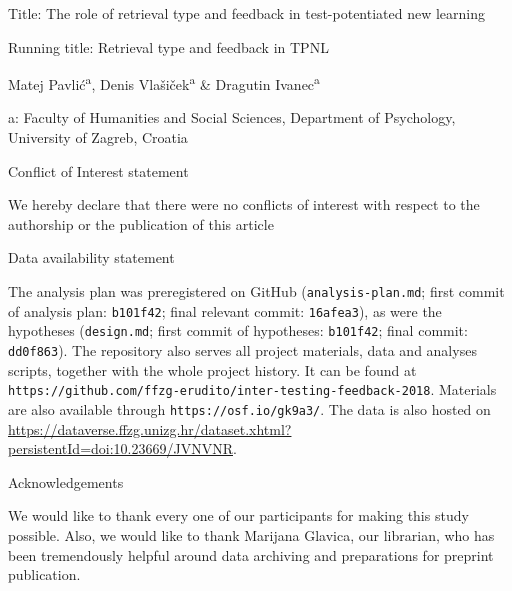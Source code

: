 \documentclass[12pt]{article}
\begin{document}
\begin{titlepage}
    \begin{center}

        \vspace*{\fill}

        Title: The role of retrieval type and feedback in 
        test-potentiated new learning
        
        Running title: Retrieval type and feedback in TPNL

        \bigskip
        Matej Pavlić\textsuperscript{a}, Denis Vlašiček\textsuperscript{a} 
        \& Dragutin Ivanec\textsuperscript{a}

        a: Faculty of Humanities and Social Sciences, Department of 
        Psychology, University of Zagreb, Croatia

        \bigskip
		\bigskip
		\bigskip

	    \end{center}
		
		{\centering
			Conflict of Interest statement\par}
		We hereby declare that there were no conflicts of 
		interest with respect to the authorship or the 
		publication of this article
		
		\bigskip
		
		{\centering
		Data availability statement\par}

		The analysis plan was preregistered on GitHub 
		(\texttt{analysis-plan.md};
		first commit of analysis plan: \texttt{b101f42}; 
		final relevant commit:
		\texttt{16afea3}), as were the hypotheses 
		(\texttt{design.md}; first commit of hypotheses:
		\texttt{b101f42}; final commit: \texttt{dd0f863}).  
		The repository also serves all
		project materials, data and analyses scripts, 
		together with the whole project
		history. It can be found at
		\texttt{https://github.com/ffzg-erudito/inter-testing-feedback-2018}.
		Materials are also available through 
		\texttt{https://osf.io/gk9a3/}. The data
		is also hosted on
		\url{https://dataverse.ffzg.unizg.hr/dataset.xhtml?persistentId=doi:10.23669/JVNVNR}.

		\bigskip
		
		{\centering
			Acknowledgements\par}
		
		We would like to thank every one of our 
		participants for making this study
		possible. Also, we would like to thank Marijana 
		Glavica, our librarian,
		who has been tremendously helpful around data 
		archiving and preparations
		for preprint publication.	
		

		
		
        \vspace*{\fill}

 

\end{titlepage}
\end{document}
